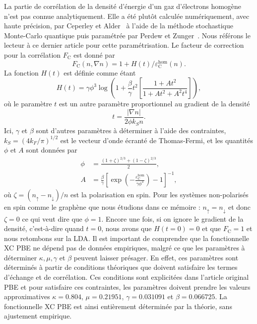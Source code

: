 La partie de corrélation de la densité d'énergie d'un gaz d'électrons homogène n'est pas connue analytiquement. Elle a été plutôt calculée numériquement, avec haute précision, par Ceperley et Alder~\cite{ceperleyGroundStateElectron1980} à l'aide de la méthode stochastique Monte-Carlo quantique puis paramétrée par Perdew et Zunger~\cite{perdewSelfinteractionCorrectionDensityfunctional1981}. Nous référons le lecteur à ce dernier article pour cette paramétrisation. Le facteur de correction pour la corrélation $F_\text{C}$ est donné par
\begin{equation}
    \label{eqn:a1_FC}
    F_\text{C}(n,\nabla n) = 1+H(t)/\varepsilon_\text{C}^\text{hom}(n).
\end{equation}
La fonction $H(t)$ est définie comme étant
\begin{equation}
    H(t) = \gamma\phi^3\log\left(1+\frac{\beta}{\gamma}t^2\left[\frac{1+At^2}{1+At^2+A^2t^4}\right]\right),
    \label{eqn:a1_Ht}
\end{equation}
où le paramètre $t$ est un autre paramètre proportionnel au gradient de la densité
\begin{equation}
    t = \frac{|\nabla n|}{2\phi k_Sn}.
\end{equation}
Ici, $\gamma$ et $\beta$ sont d'autres paramètres à déterminer à l'aide des contraintes, $k_S=(4k_F/\pi)^{1/2}$ est le vecteur d'onde écranté de Thomas-Fermi, et les quantités $\phi$ et $A$ sont données par
\begin{align}
    \phi &= \frac{(1+\zeta)^{2/3}+(1-\zeta)^{2/3}}{2},\\
    A &= \frac{\beta}{\gamma}\left[\exp\left(-\frac{\varepsilon_\text{C}^\text{hom}}{\gamma\phi^3}\right)-1\right]^{-1},
\end{align}
où $\zeta=(n_\uparrow-n_\downarrow)/n $ est la polarisation en spin. Pour les systèmes non-polarisés en spin comme le graphène que nous étudions dans ce mémoire : $n_\uparrow = n_\downarrow$ et donc $\zeta=0$ ce qui veut dire que $\phi=1$. Encore une fois, si on ignore le gradient de la densité, c'est-à-dire quand $t=0$, nous avons que $H(t=0)=0$ et que $F_\text{C}=1$ et nous retombons sur la LDA. Il est important de comprendre que la fonctionnelle XC PBE ne dépend pas de données empiriques, malgré ce que les paramètres à déterminer $\kappa, \mu,\gamma$ et $\beta$ peuvent laisser présager. En effet, ces paramètres sont déterminés à partir de conditions théoriques que doivent satisfaire les termes d'échange et de corrélation. Ces conditions sont explicitées dans l'article original PBE \cite{perdewGeneralizedGradientApproximation1996a} et pour satisfaire ces contraintes, les paramètres doivent prendre les valeurs approximatives $\kappa=0.804$, $\mu=0.21951$, $\gamma=0.031091$ et $\beta=0.066725$. La fonctionnelle XC PBE est ainsi entièrement déterminée par la théorie, sans ajustement empirique.